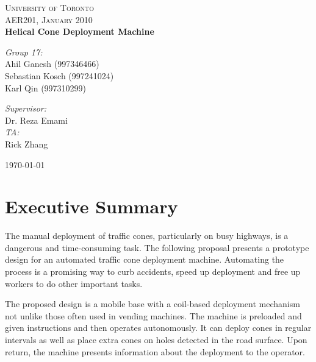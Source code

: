 \documentclass[11pt]{report}
\begin{document}
\begin{titlepage}
 \begin{center}

\textsc{\large University of Toronto}\\[1.1cm]
\textsc{\normalsize AER201, January 2010}\\[1.5cm]


{ \huge \bfseries Helical Cone Deployment Machine}\\[2.4cm]

\begin{minipage}{0.4\textwidth}
\begin{flushleft} \large
\emph{Group 17:}\\
Ahil Ganesh (997346466)\\
Sebastian Kosch (997241024)\\
Karl Qin (997310299)\\
\end{flushleft}
\end{minipage}
\begin{minipage}{0.4\textwidth}
\begin{flushright} \large
\emph{Supervisor:} \\
Dr. Reza Emami\\
\emph{TA:}\\
Rick Zhang\\
\end{flushright}
\end{minipage}

\vfill

{\large \today}

\end{center}
\end{titlepage}
\setcounter{tocdepth}{2}
\tableofcontents
\chapter{Executive Summary}
The manual deployment of traffic cones, particularly on busy highways, is a dangerous and time-consuming task. The following proposal presents a prototype design for an automated traffic cone deployment machine. Automating the process is a promising way to curb accidents, speed up deployment and free up workers to do other important tasks.

The proposed design is a mobile base with a coil-based deployment mechanism not unlike those often used in vending machines. The machine is preloaded and given instructions and then operates autonomously. It can deploy cones in regular intervals as well as place extra cones on holes detected in the road surface. Upon return, the machine presents information about the deployment to the operator.
\end{document}
